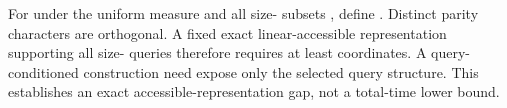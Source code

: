 {}
\markdownRendererSectionEnd \markdownRendererSectionBegin
{}\markdownRendererInterblockSeparator
{}For  under the uniform measure and all size- subsets , define . Distinct parity characters are orthogonal. A fixed exact linear-accessible representation supporting all size- queries therefore requires at least  coordinates. A query-conditioned construction need expose only the selected query structure. This establishes an exact accessible-representation gap, not a total-time lower bound.
\markdownRendererSectionEnd 
\markdownRendererSectionEnd \markdownRendererDocumentEnd